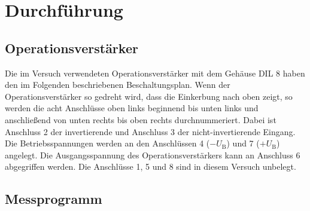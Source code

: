  \section{Durchführung}
\label{sec:Durchführung}

\subsection{Operationsverstärker}

Die im Versuch verwendeten Operationsverstärker mit dem Gehäuse DIL 8 haben den im Folgenden
beschriebenen Beschaltungsplan. Wenn der Operationsverstärker so gedreht wird, dass die Einkerbung
nach oben zeigt, so werden die acht Anschlüsse oben links beginnend bis unten links und anschließend
von unten rechts bis oben rechts durchnummeriert. Dabei ist Anschluss 2 der invertierende und
Anschluss 3 der nicht-invertierende Eingang. Die Betriebsspannungen werden an den Anschlüssen 4 ($-U_\text{B}$) und 7 ($+U_\text{B}$)
angelegt. Die Ausgangsspannung des Operationsverstärkers kann an Anschluss 6 abgegriffen werden. Die Anschlüsse
1, 5 und 8 sind in diesem Versuch unbelegt.

\subsection{Messprogramm}

